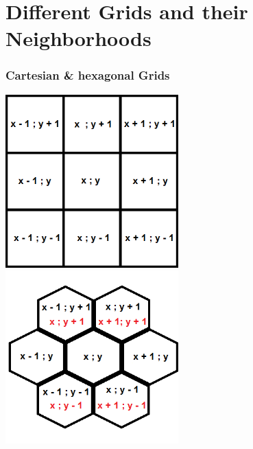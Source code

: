 \documentclass{beamer}
\begin{document}
\section{Different Grids and their Neighborhoods} 

\begin{frame}
\frametitle{Cartesian \& hexagonal Grids}
\includegraphics[width=0.5\textwidth]{imgs/cartesian.png}
\includegraphics[width=0.5\textwidth]{imgs/hexagonal.png}
\end{frame}
\end{document}

